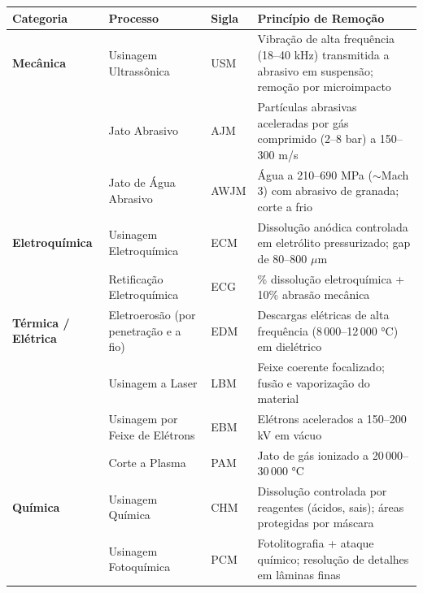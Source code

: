 \documentclass[
  12pt,
  a4paper,
  oneside,
  brazil,
  chapter=TITLE
]{article}
\begin{document}
{\def\LTcaptype{none}
\begin{longtable}[]{@{}
  >{\raggedright\arraybackslash}p{}
  >{\raggedright\arraybackslash}p{}
  >{\raggedright\arraybackslash}p{}
  >{\raggedright\arraybackslash}p{}@{}}
\toprule\noalign{}
\begin{minipage}[b]{\linewidth}\raggedright
Categoria
\end{minipage} & \begin{minipage}[b]{\linewidth}\raggedright
Processo
\end{minipage} & \begin{minipage}[b]{\linewidth}\raggedright
Sigla
\end{minipage} & \begin{minipage}[b]{\linewidth}\raggedright
Princípio de Remoção
\end{minipage} \\
\midrule\noalign{}
\endhead
\bottomrule\noalign{}
\endlastfoot
\textbf{Mecânica} & Usinagem Ultrassônica & USM & Vibração de alta frequência (18--40 kHz) transmitida a abrasivo em suspensão; remoção por microimpacto \\
 & Jato Abrasivo & AJM & Partículas abrasivas aceleradas por gás comprimido (2--8 bar) a 150--300 m/s \\
 & Jato de Água Abrasivo & AWJM & Água a 210--690 MPa ($\sim$Mach 3) com abrasivo de granada; corte a frio \\
\textbf{Eletroquímica} & Usinagem Eletroquímica & ECM & Dissolução anódica controlada em eletrólito pressurizado; gap de 80--800 $\mu$m \\
 & Retificação Eletroquímica & ECG & 90\% dissolução eletroquímica + 10\% abrasão mecânica \\
\textbf{Térmica / Elétrica} & Eletroerosão (por penetração e a fio) & EDM & Descargas elétricas de alta frequência (8\,000--12\,000 °C) em dielétrico \\
 & Usinagem a Laser & LBM & Feixe coerente focalizado; fusão e vaporização do material \\
 & Usinagem por Feixe de Elétrons & EBM & Elétrons acelerados a 150--200 kV em vácuo \\
 & Corte a Plasma & PAM & Jato de gás ionizado a 20\,000--30\,000 °C \\
\textbf{Química} & Usinagem Química & CHM & Dissolução controlada por reagentes (ácidos, sais); áreas protegidas por máscara \\
 & Usinagem Fotoquímica & PCM & Fotolitografia + ataque químico; resolução de detalhes em lâminas finas \\
\end{longtable}
}
\end{document}
